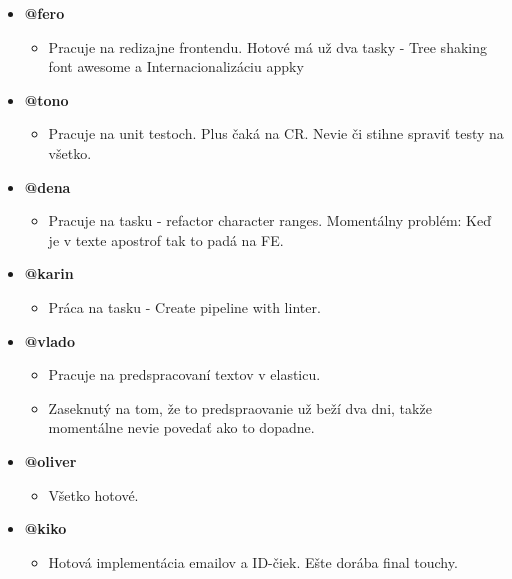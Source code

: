 \documentclass{article}
\begin{document}
    \begin{itemize}
        \item \textbf {@fero}
        \begin{itemize}
            \item Pracuje na redizajne frontendu. Hotové má už dva tasky - Tree shaking font awesome a Internacionalizáciu appky
        \end{itemize}
        \item \textbf {@tono}
        \begin{itemize}
            \item Pracuje na unit testoch. Plus čaká na CR. Nevie či stihne spraviť testy na všetko. 
        \end{itemize}
        \item \textbf {@dena}
        \begin{itemize}
            \item Pracuje na tasku - refactor character ranges. Momentálny problém: Keď je v texte apostrof tak to padá na FE.  
        \end{itemize}
        \item \textbf {@karin}
        \begin{itemize}
            \item Práca na tasku - Create pipeline with linter. 
        \end{itemize}
        \item \textbf {@vlado}
        \begin{itemize}
            \item Pracuje na predspracovaní textov v elasticu. 
            \item Zaseknutý na tom, že to predspraovanie už beží dva dni, takže momentálne nevie povedať ako to dopadne. 
        \end{itemize}
        \item \textbf {@oliver}
        \begin{itemize}
            \item Všetko hotové.  
        \end{itemize}
        \item \textbf {@kiko}
        \begin{itemize}
            \item Hotová implementácia emailov a ID-čiek. Ešte dorába final touchy.
        \end{itemize}
    \end{itemize}    
\end{document}
